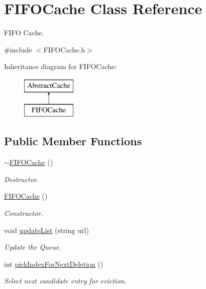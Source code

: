 \hypertarget{classFIFOCache}{\section{\-F\-I\-F\-O\-Cache \-Class \-Reference}
\label{classFIFOCache}
}


\-F\-I\-F\-O \-Cache.  




{\ttfamily \#include $<$\-F\-I\-F\-O\-Cache.\-h$>$}

\-Inheritance diagram for \-F\-I\-F\-O\-Cache\-:\begin{figure}[H]
\begin{center}
\leavevmode
\includegraphics[height=2.000000cm]{classFIFOCache}
\end{center}
\end{figure}
\subsection*{\-Public \-Member \-Functions}
\begin{DoxyCompactItemize}
\item 
\hypertarget{classFIFOCache_a1ae7ca5adab1d06c341510f1f2fee299}{\hyperlink{classFIFOCache_a1ae7ca5adab1d06c341510f1f2fee299}{$\sim$\-F\-I\-F\-O\-Cache} ()}\label{classFIFOCache_a1ae7ca5adab1d06c341510f1f2fee299}

\begin{DoxyCompactList}\small\item\em \-Destructor. \end{DoxyCompactList}\item 
\hypertarget{classFIFOCache_a12486ada6ceb70c77f3cd4f40f295928}{\hyperlink{classFIFOCache_a12486ada6ceb70c77f3cd4f40f295928}{\-F\-I\-F\-O\-Cache} ()}\label{classFIFOCache_a12486ada6ceb70c77f3cd4f40f295928}

\begin{DoxyCompactList}\small\item\em \-Constructor. \end{DoxyCompactList}\item 
void \hyperlink{classFIFOCache_a73b7632a308ed4813d8c7e03cf597d47}{update\-List} (string url)
\begin{DoxyCompactList}\small\item\em \-Update the \-Queue. \end{DoxyCompactList}\item 
int \hyperlink{classFIFOCache_a16f6449563e0e83af7069406a14089e9}{pick\-Index\-For\-Next\-Deletion} ()
\begin{DoxyCompactList}\small\item\em \-Select next candidate entry for eviction. \end{DoxyCompactList}\end{DoxyCompactItemize}



